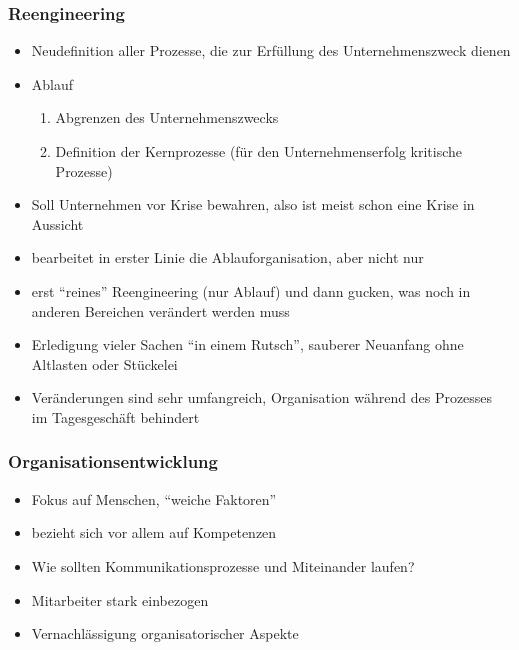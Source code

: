 \documentclass[a4paper, 12pt]{article}
\begin{document}
\subsubsection{Reengineering}
\begin{itemize}
  \item Neudefinition aller Prozesse, die zur Erfüllung des Unternehmenszweck dienen
  \item Ablauf
    \begin{enumerate}
      \item Abgrenzen des Unternehmenszwecks
      \item Definition der Kernprozesse (für den Unternehmenserfolg kritische Prozesse)
    \end{enumerate}
  \item Soll Unternehmen vor Krise bewahren, also ist meist schon eine Krise in Aussicht
  \item bearbeitet in erster Linie die Ablauforganisation, aber nicht nur
  \item erst ``reines'' Reengineering (nur Ablauf) und dann gucken, was noch in anderen Bereichen verändert werden muss
\end{itemize}
\begin{itemize}
  \renewcommand{\labelitemi}{+}%
  \item Erledigung vieler Sachen ``in einem Rutsch'', sauberer Neuanfang ohne Altlasten oder Stückelei
\end{itemize}
\begin{itemize}
  \renewcommand{\labelitemi}{\(-\)}%
  \item Veränderungen sind sehr umfangreich, Organisation während des Prozesses im Tagesgeschäft behindert
\end{itemize}

\subsubsection{Organisationsentwicklung}
\begin{itemize}
  \item Fokus auf Menschen, ``weiche Faktoren''
  \item bezieht sich vor allem auf Kompetenzen
  \item Wie sollten Kommunikationsprozesse und Miteinander laufen?
\end{itemize}
\begin{itemize}
  \renewcommand{\labelitemi}{+}%
  \item Mitarbeiter stark einbezogen
\end{itemize}
\begin{itemize}
  \renewcommand{\labelitemi}{\(-\)}%
  \item Vernachlässigung organisatorischer Aspekte
\end{itemize}
\end{document}
